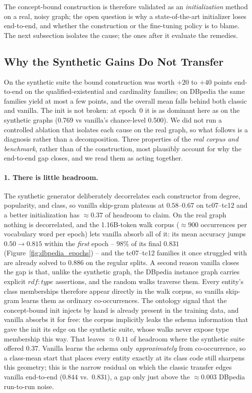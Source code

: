 \documentclass[a4paper,oneside,bibliography=totoc]{scrbook}
\begin{document}
The concept-bound construction is therefore validated as an
\emph{initialization} method on a real, noisy graph; the open question is why a
state-of-the-art initializer loses end-to-end, and whether the construction or
the fine-tuning policy is to blame. The next subsection isolates the cause; the
ones after it evaluate the remedies.

\subsection{Why the Synthetic Gains Do Not Transfer}
\label{sec:dbpedia_diagnosis}

On the synthetic suite the bound construction was worth $+20$ to $+40$ points
end-to-end on the qualified-existential and cardinality families; on DBpedia the
same families yield at most a few points, and the overall mean falls behind both
classic and vanilla. The init is not broken: at epoch~0 it is as dominant here
as on the synthetic graphs (0.769 vs vanilla's chance-level 0.500). We did not
run a controlled ablation that isolates each cause on the real graph, so what
follows is a diagnosis rather than a decomposition. Three properties of the
\emph{real corpus and benchmark}, rather than of the construction, most
plausibly account for why the end-to-end gap closes, and we read them as acting
together.

\paragraph{1. There is little headroom.}
The synthetic generator deliberately decorrelates each constructor from degree,
popularity, and class, so vanilla skip-gram plateaus at $0.58$--$0.67$ on
tc07--tc12 and a better initialization has $\approx 0.37$ of headroom to claim.
On the real graph nothing is decorrelated, and the 1.16B-token walk corpus
($\approx 900$ occurrences per vocabulary word per epoch) lets vanilla absorb
all of it: its mean accuracy jumps $0.50 \rightarrow 0.815$ within the
\emph{first} epoch -- 98\% of its final $0.831$ (Figure~\ref{fig:dbpedia_epochs})
 -- and the tc07--tc12 families it once struggled with are already solved to
$0.886$ on the regular splits. A second reason vanilla closes the gap is that,
unlike the synthetic graph, the DBpedia instance graph carries explicit
$\mathit{rdf{:}type}$ assertions, and the random walks traverse them. Every
entity's class memberships therefore appear directly in the walk corpus, so
vanilla skip-gram learns them as ordinary co-occurrences. The ontology signal
that the concept-bound init injects by hand is already present in the training
data, and vanilla absorbs it for free: the corpus implicitly leaks the schema
information that gave the init its edge on the synthetic suite, whose walks never
expose type membership this way. That leaves $\approx 0.11$ of headroom where the
synthetic suite offered $0.37$. Vanilla learns the schema only
\emph{approximately} from co-occurrence, so a class-mean start that places every
entity exactly at its class code still sharpens this geometry; this is the narrow
residual on which the classic transfer edges vanilla end-to-end ($0.844$ vs.\
$0.831$), a gap only just above the ${\approx}0.003$ DBpedia run-to-run noise.
\end{document}
